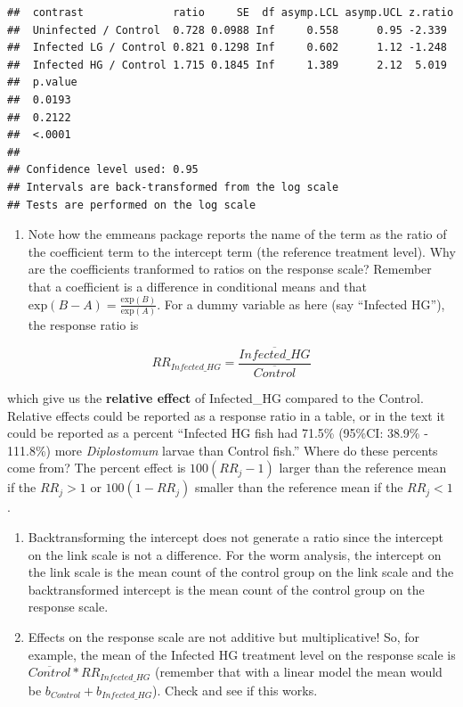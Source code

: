 \documentclass[]{book}
\providecommand{\tightlist}{%
  \setlength{\itemsep}{0pt}\setlength{\parskip}{0pt}}
\begin{document}
\begin{verbatim}
##  contrast              ratio     SE  df asymp.LCL asymp.UCL z.ratio
##  Uninfected / Control  0.728 0.0988 Inf     0.558      0.95 -2.339 
##  Infected LG / Control 0.821 0.1298 Inf     0.602      1.12 -1.248 
##  Infected HG / Control 1.715 0.1845 Inf     1.389      2.12  5.019 
##  p.value
##  0.0193 
##  0.2122 
##  <.0001 
## 
## Confidence level used: 0.95 
## Intervals are back-transformed from the log scale 
## Tests are performed on the log scale
\end{verbatim}

\begin{enumerate}
\def\labelenumi{\arabic{enumi}.}
\tightlist
\item
  Note how the emmeans package reports the name of the term as the ratio
  of the coefficient term to the intercept term (the reference treatment
  level). Why are the coefficients tranformed to ratios on the response
  scale? Remember that a coefficient is a difference in conditional
  means and that
  \(\mathrm{exp}(B-A) = \frac{\mathrm{exp}(B)}{\mathrm{exp}(A)}\). For a
  dummy variable as here (say ``Infected HG''), the response ratio is
\end{enumerate}

\begin{equation}
RR_{Infected\_HG} = \frac{\overline{Infected\_HG}}{\overline{Control}}
\end{equation}

which give us the \textbf{relative effect} of Infected\_HG compared to
the Control. Relative effects could be reported as a response ratio in a
table, or in the text it could be reported as a percent ``Infected HG
fish had 71.5\% (95\%CI: 38.9\% - 111.8\%) more \emph{Diplostomum}
larvae than Control fish.'' Where do these percents come from? The
percent effect is \(100(RR_j - 1)\) larger than the reference mean if
the \(RR_j > 1\) or \(100(1 - RR_j)\) smaller than the reference mean if
the \(RR_j < 1\).

\begin{enumerate}
\def\labelenumi{\arabic{enumi}.}
\setcounter{enumi}{1}
\item
  Backtransforming the intercept does not generate a ratio since the
  intercept on the link scale is not a difference. For the worm
  analysis, the intercept on the link scale is the mean count of the
  control group on the link scale and the backtransformed intercept is
  the mean count of the control group on the response scale.
\item
  Effects on the response scale are not additive but multiplicative! So,
  for example, the mean of the Infected HG treatment level on the
  response scale is \(\overline{Control}*RR_{Infected\_HG}\) (remember
  that with a linear model the mean would be
  \(b_{Control} + b_{Infected\_HG}\)). Check and see if this works.
\end{enumerate}
\end{document}
